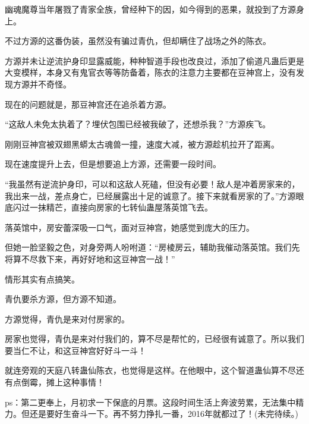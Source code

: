 \begin{this_body}
幽魂魔尊当年屠戮了青家全族，曾经种下的因，如今得到的恶果，就投到了方源身上。

不过方源的这番伪装，虽然没有骗过青仇，但却瞒住了战场之外的陈衣。

方源并未让逆流护身印显露威能，种种智道手段也改良过，添加了偷道凡蛊后更是大变模样，本身又有鬼官衣等等防备着，陈衣的注意力主要都在豆神宫上，没有发现方源并不奇怪。

现在的问题就是，那豆神宫还在追杀着方源。

“这敌人未免太执着了？埋伏包围已经被我破了，还想杀我？”方源疾飞。

刚刚豆神宫被双翅黑蟒太古魂兽一撞，速度大减，被方源趁机拉开了距离。

现在速度提升上去，但是想要追上方源，还需要一段时间。

“我虽然有逆流护身印，可以和这敌人死磕，但没有必要！敌人是冲着房家来的，我出来一战，差点身亡，已经展露出十足的诚意了。接下来就看房家的了。”方源眼底闪过一抹精芒，直接向房家的七转仙蛊屋落英馆飞去。

落英馆中，房安蕾深吸一口气，面对豆神宫，她感觉到庞大的压力。

但她一脸坚毅之色，对身旁两人吩咐道：“房棱房云，辅助我催动落英馆。我们先将算不尽救下来，再好好地和这豆神宫一战！”

情形其实有点搞笑。

青仇要杀方源，但方源不知道。

方源觉得，青仇是来对付房家的。

房家也觉得，青仇是来对付我们的，算不尽是帮忙的，已经很有诚意了。所以我们要当仁不让，和这豆神宫好好斗一斗！

就连旁观的天庭八转蛊仙陈衣，也觉得是这样。在他眼中，这个智道蛊仙算不尽还有点倒霉，摊上这种事情！

ps：第二更奉上，月初求一下保底的月票。这段时间生活上奔波劳累，无法集中精力。但还是要好生奋斗一下。再不努力挣扎一番，2016年就都过了！(未完待续。)

\end{this_body}

